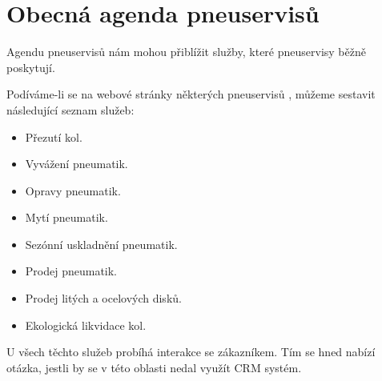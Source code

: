 \section{Obecná agenda pneuservisů}
Agendu pneuservisů nám mohou přiblížit služby, které pneuservisy běžně poskytují. 

Podíváme-li se na webové stránky některých pneuservisů \cite{AutoKarlinPneuservis}\cite{AutoservisGarantPneuservis}\cite{AMBservisPneuservis}, můžeme sestavit následující seznam služeb:
\begin{itemize}
    \item Přezutí kol.
    \item Vyvážení pneumatik.
    \item Opravy pneumatik.
    \item Mytí pneumatik.
    \item Sezónní uskladnění pneumatik.
    \item Prodej pneumatik.
    \item Prodej litých a ocelových disků.
    \item Ekologická likvidace kol.
\end{itemize}

U všech těchto služeb probíhá interakce se zákazníkem. Tím se hned nabízí otázka, jestli by se v této oblasti nedal využít CRM systém.
